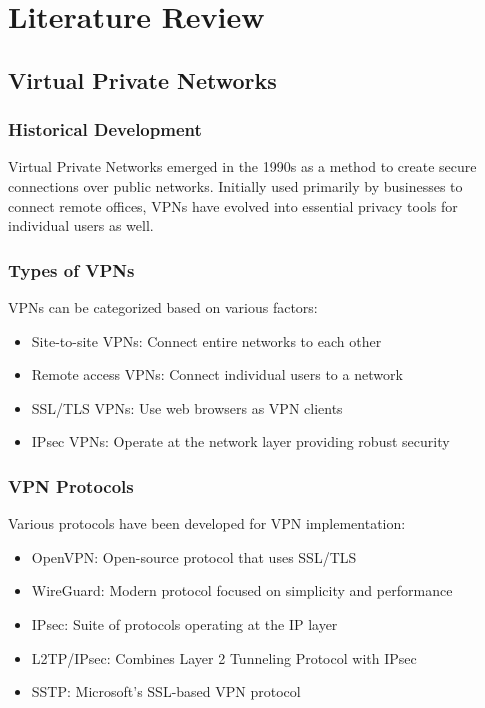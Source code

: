 \documentclass[12pt,a4paper]{report}
\begin{document}
\chapter{Literature Review}
\section{Virtual Private Networks}
\subsection{Historical Development}
Virtual Private Networks emerged in the 1990s as a method to create secure connections over public networks. Initially used primarily by businesses to connect remote offices, VPNs have evolved into essential privacy tools for individual users as well.

\subsection{Types of VPNs}
VPNs can be categorized based on various factors:
\begin{itemize}
    \item Site-to-site VPNs: Connect entire networks to each other
    \item Remote access VPNs: Connect individual users to a network
    \item SSL/TLS VPNs: Use web browsers as VPN clients
    \item IPsec VPNs: Operate at the network layer providing robust security
\end{itemize}

\subsection{VPN Protocols}
Various protocols have been developed for VPN implementation:
\begin{itemize}
    \item OpenVPN: Open-source protocol that uses SSL/TLS
    \item WireGuard: Modern protocol focused on simplicity and performance
    \item IPsec: Suite of protocols operating at the IP layer
    \item L2TP/IPsec: Combines Layer 2 Tunneling Protocol with IPsec
    \item SSTP: Microsoft's SSL-based VPN protocol
\end{itemize}
\end{document}

